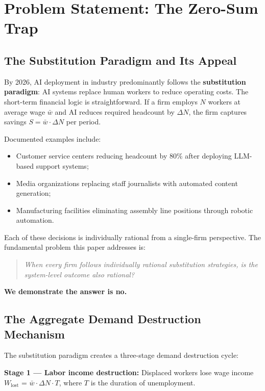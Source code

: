 \documentclass[conference]{IEEEtran}
\begin{document}
\section{Problem Statement: The Zero-Sum Trap}

\subsection{The Substitution Paradigm and Its Appeal}

By 2026, AI deployment in industry predominantly follows
the \textbf{substitution paradigm}: AI systems replace
human workers to reduce operating costs. The short-term
financial logic is straightforward. If a firm employs
$N$ workers at average wage $\bar{w}$ and AI reduces
required headcount by $\Delta N$, the firm captures
savings $S = \bar{w} \cdot \Delta N$ per period.

Documented examples include:
\begin{itemize}
  \item Customer service centers reducing headcount by 80\%
        after deploying LLM-based support systems;
  \item Media organizations replacing staff journalists
        with automated content generation;
  \item Manufacturing facilities eliminating assembly
        line positions through robotic automation.
\end{itemize}

Each of these decisions is individually rational from
a single-firm perspective. The fundamental problem
this paper addresses is:

\begin{quote}
\textit{When every firm follows individually rational
substitution strategies, is the system-level outcome
also rational?}
\end{quote}

\textbf{We demonstrate the answer is no.}

\subsection{The Aggregate Demand Destruction Mechanism}

The substitution paradigm creates a three-stage
demand destruction cycle:

\textbf{Stage 1 --- Labor income destruction:}
Displaced workers lose wage income $W_{\text{lost}}$
= $\bar{w} \cdot \Delta N \cdot T$, where $T$ is the
duration of unemployment.
\end{document}
